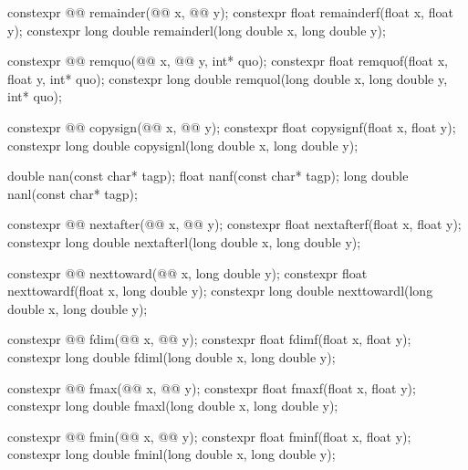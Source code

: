 \begin{codeblock}
{  constexpr @@ remainder(@@ x, @@ y);
  constexpr float               remainderf(float x, float y);
  constexpr long double         remainderl(long double x, long double y);

  constexpr @@ remquo(@@ x, @@ y, int* quo);
  constexpr float               remquof(float x, float y, int* quo);
  constexpr long double         remquol(long double x, long double y, int* quo);

  constexpr @@ copysign(@@ x, @@ y);
  constexpr float               copysignf(float x, float y);
  constexpr long double         copysignl(long double x, long double y);

  double      nan(const char* tagp);
  float       nanf(const char* tagp);
  long double nanl(const char* tagp);

  constexpr @@ nextafter(@@ x, @@ y);
  constexpr float               nextafterf(float x, float y);
  constexpr long double         nextafterl(long double x, long double y);

  constexpr @@ nexttoward(@@ x, long double y);
  constexpr float               nexttowardf(float x, long double y);
  constexpr long double         nexttowardl(long double x, long double y);

  constexpr @@ fdim(@@ x, @@ y);
  constexpr float               fdimf(float x, float y);
  constexpr long double         fdiml(long double x, long double y);

  constexpr @@ fmax(@@ x, @@ y);
  constexpr float               fmaxf(float x, float y);
  constexpr long double         fmaxl(long double x, long double y);

  constexpr @@ fmin(@@ x, @@ y);
  constexpr float               fminf(float x, float y);
  constexpr long double         fminl(long double x, long double y);

}
\end{codeblock}
